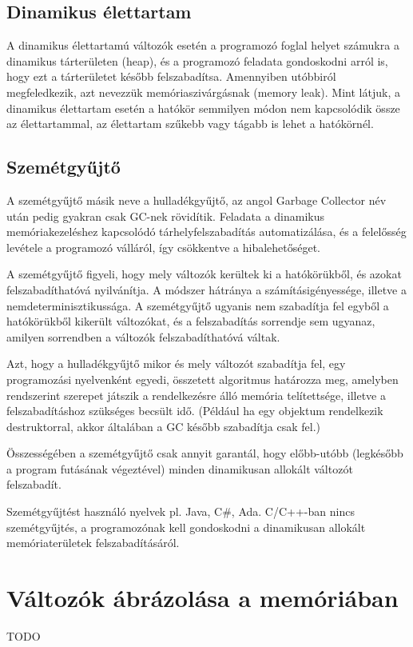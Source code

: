 \documentclass[margin=0px]{article}
\begin{document}
\subsection{Dinamikus élettartam}

A dinamikus élettartamú változók esetén a programozó foglal helyet számukra a dinamikus tárterületen (heap), és a programozó feladata gondoskodni arról is, hogy ezt a tárterületet később felszabadítsa. Amennyiben utóbbiról megfeledkezik, azt nevezzük memóriaszivárgásnak (memory leak).
Mint látjuk, a dinamikus élettartam esetén a hatókör semmilyen módon nem kapcsolódik össze az élettartammal, az élettartam szűkebb vagy tágabb is lehet a hatókörnél.

\subsection{Szemétgyűjtő}

A szemétgyűjtő másik neve a hulladékgyűjtő, az angol Garbage Collector név után pedig gyakran csak GC-nek rövidítik. Feladata a dinamikus memóriakezeléshez kapcsolódó tárhelyfelszabadítás automatizálása, és a felelősség levétele a programozó válláról, így csökkentve a hibalehetőséget.

A szemétgyűjtő figyeli, hogy mely változók kerültek ki a hatókörükből, és azokat felszabadíthatóvá nyilvánítja. A módszer hátránya a számításigényessége, illetve a nemdeterminisztikussága. A szemétgyűjtő ugyanis nem szabadítja fel egyből a hatókörükből kikerült változókat, és a felszabadítás sorrendje sem ugyanaz, amilyen sorrendben a változók felszabadíthatóvá váltak.

Azt, hogy a hulladékgyűjtő mikor és mely változót szabadítja fel, egy programozási nyelvenként egyedi, összetett algoritmus határozza meg, amelyben rendszerint szerepet játszik a rendelkezésre álló memória telítettsége, illetve a felszabadításhoz szükséges becsült idő. (Például ha egy objektum rendelkezik destruktorral, akkor általában a GC később szabadítja csak fel.)

Összességében a szemétgyűjtő csak annyit garantál, hogy előbb-utóbb (legkésőbb a program futásának végeztével) minden dinamikusan allokált változót felszabadít.

Szemétgyűjtést használó nyelvek pl. Java, C\#, Ada. C/C++-ban nincs szemétgyűjtés, a programozónak kell gondoskodni a dinamikusan allokált memóriaterületek felszabadításáról.

\section{Változók ábrázolása a memóriában}
TODO
\end{document}
